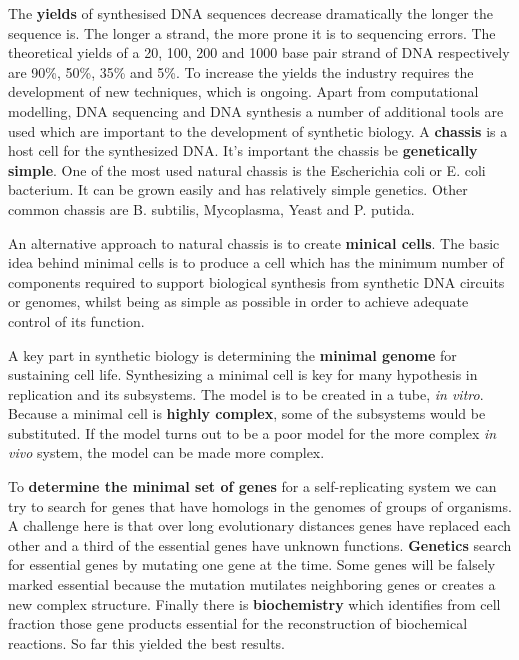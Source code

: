 \documentclass[10pt,a4paper]{report}
\begin{document}
	The \textbf{yields} of synthesised DNA sequences decrease dramatically the longer the sequence is. 
	The longer a strand, the more prone it is to sequencing errors. 
	The theoretical yields of a 20, 100, 200 and 1000 base pair strand of DNA respectively are 90\%, 50\%, 35\% and 5\%. To increase the yields the industry requires the development of new techniques, which is ongoing.
	Apart from computational modelling, DNA sequencing and DNA synthesis a number of additional tools are used which are important to the development of synthetic biology. 
	A \textbf{chassis} is a host cell for the synthesized DNA. 
	It’s important the chassis be \textbf{genetically simple}. 
	One of the most used natural chassis is the Escherichia coli or E. coli bacterium. 
	It can be grown easily and has relatively simple genetics. 
	Other common chassis are B. subtilis, Mycoplasma, Yeast and P. putida.
	 
	An alternative approach to natural chassis is to create \textbf{minical cells}. 
	The basic idea behind minimal cells is to produce a cell which has the minimum number of components required to support biological synthesis from synthetic DNA circuits or genomes, whilst being as simple as possible in order to achieve adequate control of its function.
	
	A key part in synthetic biology is determining the \textbf{minimal genome} for sustaining cell life. 
	Synthesizing a minimal cell is key for many hypothesis in replication and its subsystems. 
	The model is to be created in a tube, \textit{in vitro}. 
	Because a minimal cell is \textbf{highly complex}, some of the subsystems would be substituted. 
	If the model turns out to be a poor model for the more complex \textit{in vivo} system,  the model can be made more complex.
	
	To \textbf{determine the minimal set of genes} for a self-replicating system we can try to search for genes that have homologs in the genomes of groups of organisms. 
	A challenge here is that over long evolutionary distances genes have replaced each other and a third of the essential genes have unknown functions. 
	\textbf{Genetics} search for essential genes by mutating one gene at the time. 
	Some genes will be falsely marked essential because the mutation mutilates neighboring genes or creates a new complex structure.
	Finally there is \textbf{biochemistry} which identifies from cell fraction those gene products essential for the reconstruction of biochemical reactions. 
	So far this yielded the best results.
	
\end{document}
